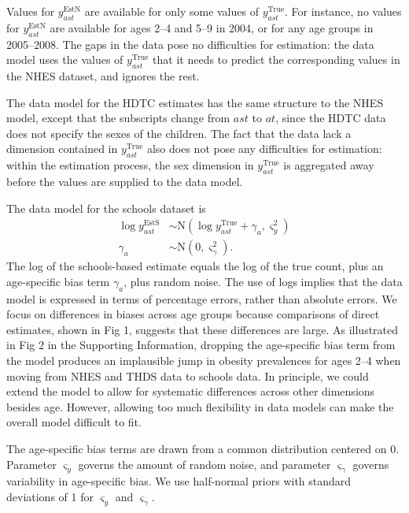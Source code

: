 \documentclass[10pt,letterpaper]{article}
\begin{document}
Values for \(y_{ast}^{\text{EstN}}\) are available for only some values
of \(y_{ast}^{\text{True}}\). For instance, no values for
\(y_{ast}^{\text{EstN}}\) are available for ages 2--4 and 5--9 in 2004,
or for any age groups in 2005--2008. The gaps in the data pose no
difficulties for estimation: the data model uses the values of
\(y_{ast}^{\text{True}}\) that it needs to predict the corresponding
values in the NHES dataset, and ignores the rest.

The data model for the HDTC estimates has the same structure to the NHES
model, except that the subscripts change from \(ast\) to \(at\), since
the HDTC data does not specify the sexes of the children. The fact that
the data lack a dimension contained in \(y_{ast}^{\text{True}}\) also
does not pose any difficulties for estimation: within the estimation
process, the sex dimension in \(y_{ast}^{\text{True}}\) is aggregated
away before the values are supplied to the data model.

The data model for the schools dataset is \begin{align}
  \log y_{ast}^{\text{EstS}} & \sim \text{N}(\log y_{ast}^{\text{True}} + \gamma_a, \varsigma_y^2) \label{eq:lik_school} \\
  \gamma_a & \sim \text{N}(0, \varsigma_{\gamma}^2).
\end{align} The log of the schools-based estimate equals the log of the
true count, plus an age-specific bias term \(\gamma_a\), plus random
noise. The use of logs implies that the data model is expressed in terms
of percentage errors, rather than absolute errors. We focus on
differences in biases across age groups because comparisons of direct
estimates, shown in Fig 1, suggests that these differences are large. As
illustrated in Fig 2 in the Supporting Information, dropping the
age-specific bias term from the model produces an implausible jump in
obesity prevalences for ages 2--4 when moving from NHES and THDS data to
schools data. In principle, we could extend the model to allow for
systematic differences across other dimensions besides age. However,
allowing too much flexibility in data models can make the overall model
difficult to fit.

The age-specific bias terms are drawn from a common distribution
centered on 0. Parameter \(\varsigma_y\) governs the amount of random
noise, and parameter \(\varsigma_{\gamma}\) governs variability in
age-specific bias. We use half-normal priors with standard deviations of
1 for \(\varsigma_y\) and \(\varsigma_{\gamma}\).
\end{document}

